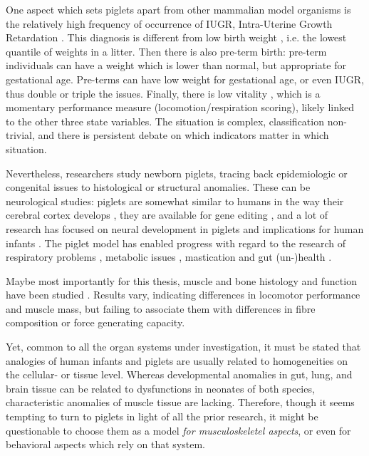 One aspect which sets piglets apart from other mammalian model organisms is the relatively high frequency of occurrence of IUGR, Intra-Uterine Growth Retardation \citep{Widdowson1971,Wu2006,VanGinneken2022}.
This diagnosis is different from low birth weight \citep{Wootton1983}, i.e. the lowest quantile of weights in a litter.
Then there is also pre-term birth: pre-term individuals can have a weight which is lower than normal, but appropriate for gestational age.
Pre-terms can have low weight for gestational age, or even IUGR, thus double or triple the issues.
Finally, there is low vitality \citep{VandenHole2018}, which is a momentary performance measure (locomotion/respiration scoring), likely linked to the other three state variables.
The situation is complex, classification non-trivial, and there is persistent debate on which indicators matter in which situation.


Nevertheless, researchers study newborn piglets, tracing back epidemiologic or congenital issues to histological or structural anomalies.
These can be neurological studies: piglets are somewhat similar to humans in the way their cerebral cortex develops \citep[e.g.][]{Lind2007}, they are available for gene editing \citep{Lind2007}, and a lot of research has focused on neural development in piglets and implications for human infants \citep{Conrad2012,Radlowski2014,Leyshon2016,Mudd2017,Dickerson1971,Fanous2020}.
The piglet model has enabled progress with regard to the research of respiratory problems \citep{Williams1974,Spengler2019}, metabolic issues \citep{Mellor1986,MotaRojas2011,VandenHole2019}, mastication and gut (un-)health \citep{Che2010,Cilieborg2011,Sangild2006,DInca2011,VandenHole2021,Mayerl2023b}.

Maybe most importantly for this thesis, muscle and bone histology and function have been studied \citep{VandenHole2018b,Alvarenga2013,Andersen2016,Aerts2023,Magrini2023}.
Results vary, indicating differences in locomotor performance and muscle mass, but failing to associate them with differences in fibre composition or force generating capacity.

Yet, common to all the organ systems under investigation, it must be stated that analogies of human infants and piglets are usually related to homogeneities on the cellular- or tissue level.
Whereas developmental anomalies in gut, lung, and brain tissue can be related to dysfunctions in neonates of both species, characteristic anomalies of muscle tissue are lacking.
Therefore, though it seems tempting to turn to piglets in light of all the prior research, it might be questionable to choose them as a model \emph{for musculoskeletel aspects}, or even for behavioral aspects which rely on that system.


